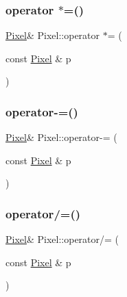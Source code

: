 \mbox{\label{class_pixel_ab5a1862968e581e773aa468f425693c0}} 
\subsubsection{\texorpdfstring{operator $\ast$=()}{operator *=()}}
{\footnotesize\ttfamily \mbox{\hyperlink{class_pixel}{Pixel}}\& Pixel\+::operator $\ast$= (\begin{DoxyParamCaption}\item[{const \mbox{\hyperlink{class_pixel}{Pixel}} \&}]{p }\end{DoxyParamCaption})\hspace{0.3cm}{\ttfamily [inline]}}

\mbox{\label{class_pixel_ae535886736ebe3cb2418448d554c57fa}} 
\subsubsection{\texorpdfstring{operator-\/=()}{operator-=()}}
{\footnotesize\ttfamily \mbox{\hyperlink{class_pixel}{Pixel}}\& Pixel\+::operator-\/= (\begin{DoxyParamCaption}\item[{const \mbox{\hyperlink{class_pixel}{Pixel}} \&}]{p }\end{DoxyParamCaption})\hspace{0.3cm}{\ttfamily [inline]}}

\mbox{\label{class_pixel_a81f936249561d59938b02e3ab47396c0}} 
\subsubsection{\texorpdfstring{operator/=()}{operator/=()}}
{\footnotesize\ttfamily \mbox{\hyperlink{class_pixel}{Pixel}}\& Pixel\+::operator/= (\begin{DoxyParamCaption}\item[{const \mbox{\hyperlink{class_pixel}{Pixel}} \&}]{p }\end{DoxyParamCaption})\hspace{0.3cm}{\ttfamily [inline]}}



